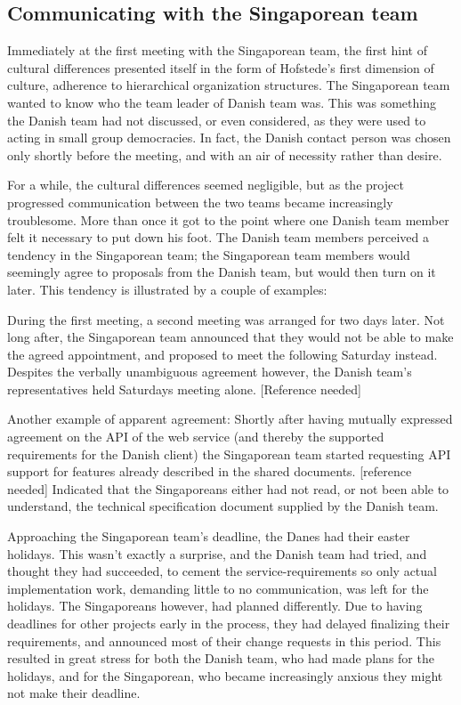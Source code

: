 \subsection{Communicating with the Singaporean team}
\label{sec:communicating}

Immediately at the first meeting with the Singaporean team, the first hint of cultural
differences presented itself in the form of Hofstede's first dimension of
culture, adherence to hierarchical organization structures\cite{surprises}. The
Singaporean team wanted to know who the team leader of Danish team was. This was something
the Danish team had not discussed, or even considered, as they were used to acting
in small group democracies.  In fact, the Danish contact person was chosen only
shortly before the meeting,
and with an air of necessity rather than desire.

For a while, the cultural differences seemed negligible, but as the project
progressed communication between the two teams became increasingly troublesome.
More than once it got to the point where one Danish team member felt it necessary
to put down his foot\cite{enough}. The Danish team members perceived a tendency in the Singaporean
team; the Singaporean team members would seemingly agree to proposals from the Danish team, but
would then turn on it later. This tendency is illustrated by a couple of
examples:

During the first meeting, a second meeting was arranged for two days later. Not
long after, the Singaporean team announced that they would not be able to make the
agreed appointment, and proposed to meet the following Saturday instead.
Despites the verbally unambiguous agreement however, the Danish team's
representatives held Saturdays meeting alone. [Reference needed]

Another example of apparent agreement: Shortly after having mutually expressed
agreement on the API of the web service (and thereby the supported requirements
for the Danish client) the Singaporean team started requesting API support for features
already described in the shared documents. [reference needed] Indicated that
the Singaporeans either had not read, or not been able to understand, the technical
specification document supplied by the Danish team.

Approaching the Singaporean team's deadline, the Danes had their easter
holidays. This wasn't exactly a surprise, and the Danish team had tried, and
thought they had succeeded, to cement the service-requirements so only actual
implementation work, demanding little to no communication, was left for the
holidays. The Singaporeans however, had planned differently. Due to having deadlines
for other projects early in the process, they had delayed finalizing their
requirements, and announced most of their change requests in this period. This
resulted in great stress for both the Danish team, who had made plans for the
holidays, and for the Singaporean, who became increasingly anxious they might not
make their deadline.

